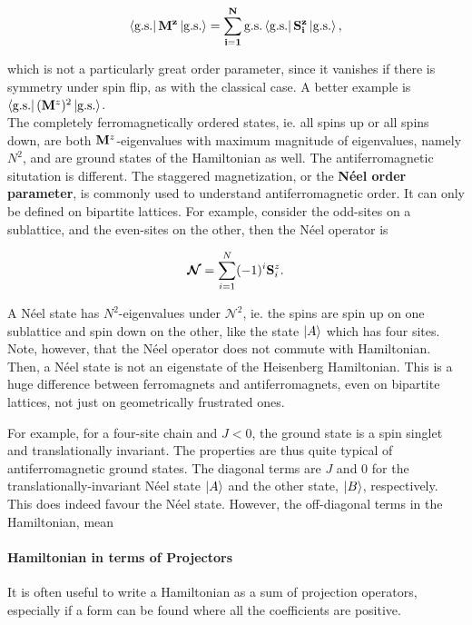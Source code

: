 \documentclass{homework}
\begin{document}
$$
    \bra{\textnormal{g.s.}} {\bf M}^z \ket{\textnormal{g.s.}} = \sum_{i=1}^N \textnormal{g.s.} \bra{\textnormal{g.s.}} {\bf S}_i^z \ket{\textnormal{g.s.}},
$$

which is not a particularly great order parameter, since it vanishes if there is symmetry under spin flip, as with the classical case. A better example is $\bra{\textnormal{g.s.}} ({\bf M}^z)^2 \ket{\textnormal{g.s.}}$. \\

The completely ferromagnetically ordered states, ie. all spins up or all spins down, are both ${\bf M}^z$-eigenvalues with maximum magnitude of eigenvalues, namely $N^2$, and are ground states of the Hamiltonian as well. The antiferromagnetic situtation is different. The staggered magnetization, or the \textbf{Néel order parameter}, is commonly used to understand antiferromagnetic order. It can only be defined on bipartite lattices. For example, consider the odd-sites on a sublattice, and the even-sites on the other, then the Néel operator is 

$$
    \bm{\mathcal N} = \sum_{i=1}^N (-1)^i {\bf S}_i^z.
$$

A Néel state has $N^2$-eigenvalues under $\bm{\mathcal N}^2$, ie. the spins are spin up on one sublattice and spin down on the other, like the state $\ket{A}$ which has four sites. Note, however, that the Néel operator does not commute with Hamiltonian. Then, a Néel state is not an eigenstate of the Heisenberg Hamiltonian. This is a huge difference between ferromagnets and antiferromagnets, even on bipartite lattices, not just on geometrically frustrated ones. 

For example, for a four-site chain and $J<0$, the ground state is a spin singlet and translationally invariant. The properties are thus quite typical of antiferromagnetic ground states. The diagonal terms are $J$ and $0$ for the translationally-invariant Néel state $\ket{A}$ and the other state, $\ket{B}$, respectively. This does indeed favour the Néel state. However, the off-diagonal terms in the Hamiltonian, mean 

\paragraph{\textbf{Hamiltonian in terms of Projectors}}

It is often useful to write a Hamiltonian as a sum of projection operators, especially if a form can be found where all the coefficients are positive. 
\end{document}
